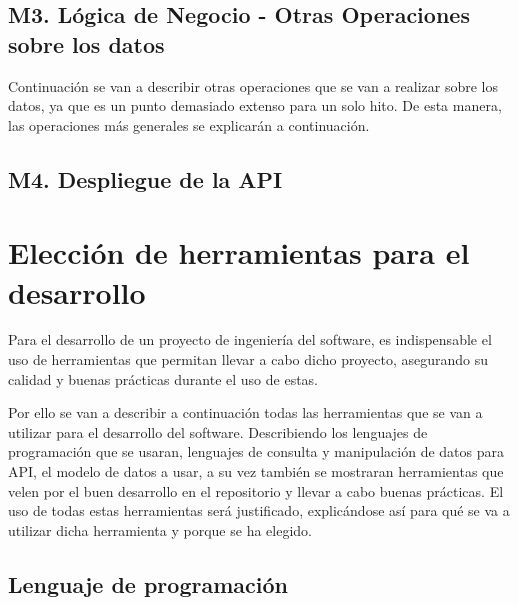 \subsection{M3. Lógica de Negocio - Otras Operaciones sobre los datos}

Continuación se van a describir otras operaciones que se van a realizar sobre los datos, ya que es un punto demasiado extenso para un solo hito. De esta manera, las operaciones más generales se explicarán a continuación.

\subsection{M4. Despliegue de la API}


\section{Elección de herramientas para el desarrollo}

Para el desarrollo de un proyecto de ingeniería del software, es indispensable el uso de herramientas que permitan llevar a cabo dicho proyecto, asegurando su calidad y buenas prácticas durante el uso de estas.

Por ello se van a describir a continuación todas las herramientas que se van a utilizar para el desarrollo del software. Describiendo los lenguajes de programación que se usaran, lenguajes de consulta y manipulación de datos para API, el modelo de datos a usar, a su vez también se mostraran herramientas que velen por el buen desarrollo en el repositorio y llevar a cabo buenas prácticas. El uso de todas estas herramientas será justificado, explicándose así para qué se va a utilizar dicha herramienta y porque se ha elegido.

\subsection{Lenguaje de programación}

